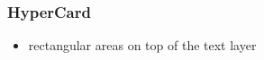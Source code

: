 \begin{frame}
\frametitle{HyperCard}
\begin{itemize}
	\item rectangular areas on top of the text layer
\end{itemize}

\end{frame}


